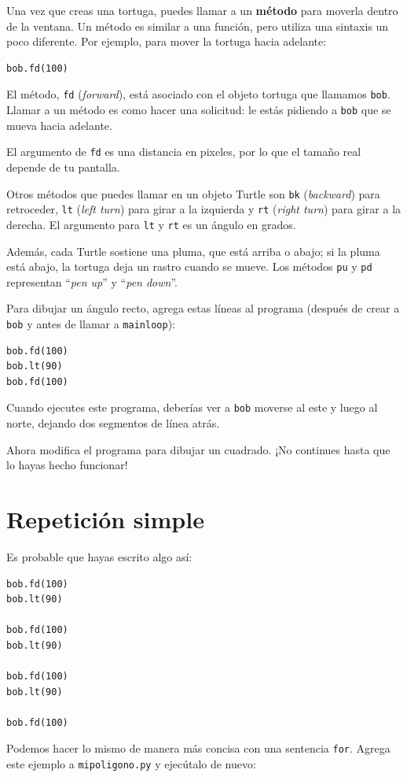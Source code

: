 \documentclass[10pt]{book}
\begin{document}
Una vez que creas una tortuga, puedes llamar a un {\bf método} para moverla
dentro de la ventana.  Un método es similar a una función, pero
utiliza una sintaxis un poco diferente.  Por ejemplo, para mover la tortuga
hacia adelante:

\begin{verbatim}
bob.fd(100)
\end{verbatim}
%
El método, {\tt fd} ({\em forward}), está asociado con el objeto
tortuga que llamamos {\tt bob}.
Llamar a un método es como hacer una solicitud: le estás pidiendo a {\tt bob}
que se mueva hacia adelante.

El argumento de {\tt fd} es una distancia en pixeles, por lo que el tamaño
real depende de tu pantalla.

Otros métodos que puedes llamar en un objeto Turtle son {\tt bk} ({\em backward}) para
retroceder, {\tt lt} ({\em left turn}) para girar a la izquierda y {\tt rt} ({\em right turn}) para girar a la derecha.  El
argumento para {\tt lt} y {\tt rt} es un ángulo en grados.

Además, cada Turtle sostiene una pluma, que está
arriba o abajo; si la pluma está abajo, la tortuga deja
un rastro cuando se mueve.  Los métodos {\tt pu} y {\tt pd}
representan ``{\em pen up}'' y ``{\em pen down}''.

Para dibujar un ángulo recto, agrega estas líneas al programa
(después de crear a {\tt bob} y antes de llamar a \verb"mainloop"):

\begin{verbatim}
bob.fd(100)
bob.lt(90)
bob.fd(100)
\end{verbatim}
%
Cuando ejecutes este programa, deberías ver a {\tt bob} moverse al este y luego
al norte, dejando dos segmentos de línea atrás.

Ahora modifica el programa para dibujar un cuadrado.  ¡No continues hasta que
lo hayas hecho funcionar!


\section{Repetición simple}
\label{repetition}

Es probable que hayas escrito algo así:

\begin{verbatim}
bob.fd(100)
bob.lt(90)

bob.fd(100)
bob.lt(90)

bob.fd(100)
bob.lt(90)

bob.fd(100)
\end{verbatim}
%
Podemos hacer lo mismo de manera más concisa con una sentencia {\tt for}.
Agrega este ejemplo a {\tt mipoligono.py} y ejecútalo de nuevo:
\end{document}
